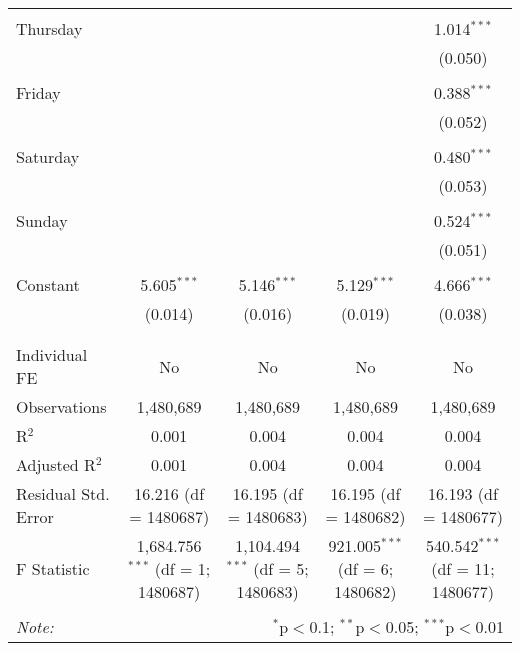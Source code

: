 \documentclass[
]{article}
\begin{document}
\begin{table}[!htbp]
{\begin{tabular}{@{\extracolsep{5pt}}lcccc}
  & & & & \\ 
 Thursday &  &  &  & 1.014$^{***}$ \\ 
  &  &  &  & (0.050) \\ 
  & & & & \\ 
 Friday &  &  &  & 0.388$^{***}$ \\ 
  &  &  &  & (0.052) \\ 
  & & & & \\ 
 Saturday &  &  &  & 0.480$^{***}$ \\ 
  &  &  &  & (0.053) \\ 
  & & & & \\ 
 Sunday &  &  &  & 0.524$^{***}$ \\ 
  &  &  &  & (0.051) \\ 
  & & & & \\ 
 Constant & 5.605$^{***}$ & 5.146$^{***}$ & 5.129$^{***}$ & 4.666$^{***}$ \\ 
  & (0.014) & (0.016) & (0.019) & (0.038) \\ 
  & & & & \\ 
\hline \\[-1.8ex] 
Individual FE & No & No & No & No \\ 
Observations & 1,480,689 & 1,480,689 & 1,480,689 & 1,480,689 \\ 
R$^{2}$ & 0.001 & 0.004 & 0.004 & 0.004 \\ 
Adjusted R$^{2}$ & 0.001 & 0.004 & 0.004 & 0.004 \\ 
Residual Std. Error & 16.216 (df = 1480687) & 16.195 (df = 1480683) & 16.195 (df = 1480682) & 16.193 (df = 1480677) \\ 
F Statistic & 1,684.756$^{***}$ (df = 1; 1480687) & 1,104.494$^{***}$ (df = 5; 1480683) & 921.005$^{***}$ (df = 6; 1480682) & 540.542$^{***}$ (df = 11; 1480677) \\ 
\hline 
\hline \\[-1.8ex] 
\textit{Note:}  & \multicolumn{4}{r}{$^{*}$p$<$0.1; $^{**}$p$<$0.05; $^{***}$p$<$0.01} \\ 
\end{tabular}
} 
\end{table} 
\newpage
\end{document}
